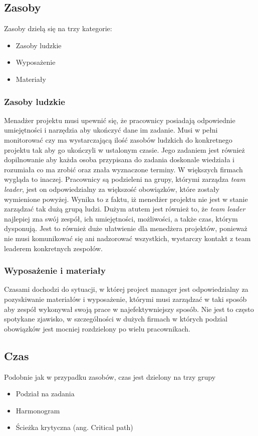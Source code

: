 \documentclass[oneside,polski,logo]{amuthesis}
\begin{document}
\subsection {Zasoby}
Zasoby dzielą się na trzy kategorie:
\begin{itemize}
	\item Zasoby ludzkie
	\item Wyposażenie
	\item Materiały
\end{itemize}
\subsubsection {Zasoby ludzkie}

Menadżer projektu musi upewnić się, że pracownicy posiadają odpowiednie umiejętności i narzędzia aby ukończyć dane im zadanie. Musi w pełni monitorować czy ma wystarczającą ilość zasobów ludzkich do konkretnego projektu tak aby go ukończyli w ustalonym czasie. Jego zadaniem jest również dopilnowanie aby każda osoba przypisana do zadania doskonale wiedziała i rozumiała co ma zrobić oraz znała wyznaczone terminy. W większych firmach wygląda to inaczej. Pracownicy są podzieleni na grupy, którymi zarządza \emph{team leader}, jest on odpowiedzialny za większość obowiązków, które zostały wymienione powyżej. Wynika to z faktu, iż menedżer projektu nie jest w stanie zarządzać tak dużą grupą ludzi. Dużym atutem jest również to, że \emph{team leader} najlepiej zna swój zespół, ich umiejętności, możliwości, a także czas, którym dysponują. Jest to również duże ułatwienie dla menedżera projektów, ponieważ nie musi komunikować się ani nadzorować wszystkich, wystarczy kontakt z team leaderem konkretnych zespołów. 

\subsubsection {Wyposażenie i materiały}
Czasami dochodzi do sytuacji, w której project manager jest odpowiedzialny za pozyskiwanie materiałów i wyposażenie, którymi musi zarządzać w taki sposób aby zespół wykonywał swoją prace w najefektywniejszy sposób. Nie jest to często spotykane zjawisko, w szczególności w dużych firmach w których podzial obowiązków jest mocniej rozdzielony po wielu pracownikach.

\subsection {Czas}
Podobnie jak w przypadku zasobów, czas jest dzielony na trzy grupy
\begin{itemize}
	\item Podział na zadania
	\item Harmonogram
	\item Ścieżka krytyczna (ang. Critical path)
\end{itemize}
\end{document}
